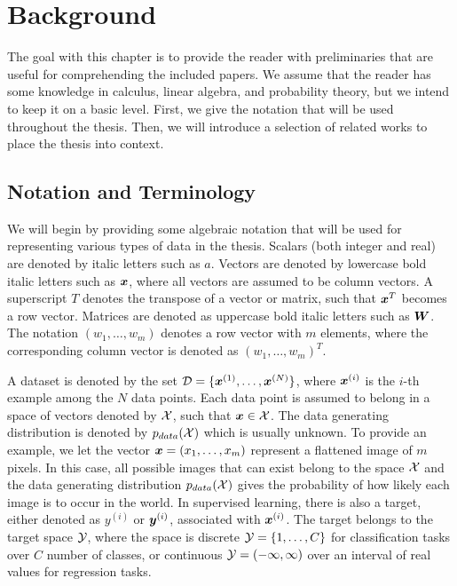 
\chapter{Background}
\label{chap:background}

The goal with this chapter is to provide the reader with preliminaries that are useful for comprehending the included papers. We assume that the reader has some knowledge in calculus, linear algebra, and probability theory, but we intend to keep it on a basic level. First, we give the notation that will be used throughout the thesis. Then, we will introduce a selection of related works to place the thesis into context. 

\section{Notation and Terminology}\label{sec:notation}

We will begin by providing some algebraic notation that will be used for representing various types of data in the thesis. Scalars (both integer and real) are denoted by italic letters such as $a$. Vectors are denoted by lowercase bold italic letters such as ${\bm{x}}$, where all vectors are assumed to be column vectors. A superscript $T$ denotes the transpose of a vector or matrix, such that ${\bm{x}}^{T}$ becomes a row vector. Matrices are denoted as uppercase bold italic letters such as ${\bm{W}}$. The notation $(w_1, \dots, w_m)$ denotes a row vector with $m$ elements, where the corresponding column vector is denoted as $(w_1, \dots, w_m)^{T}$. 

A dataset is denoted by the set ${\mathcal{D}} = \{{\bm{x}}^{(1)}, \dots, {\bm{x}}^{(N)} \}$, where ${\bm{x}}^{(i)}$ is the $i$-th example among the $N$ data points. Each data point is assumed to belong in a space of vectors denoted by ${\mathcal{X}}$, such that ${\bm{x}} \in {\mathcal{X}}$. The data generating distribution is denoted by $p_{data}({\mathcal{X}})$ which is usually unknown. To provide an example, we let the vector ${\bm{x}} = (x_1, \dots, x_m)$ represent a flattened image of $m$ pixels. In this case, all possible images that can exist belong to the space ${\mathcal{X}}$ and the data generating distribution $p_{data}({\mathcal{X}})$ gives the probability of how likely each image is to occur in the world. In supervised learning, there is also a target, either denoted as $y^{(i)}$ or ${\bm{y}}^{(i)}$, associated with ${\bm{x}}^{(i)}$. The target belongs to the target space ${\mathcal{Y}}$, where the space is discrete ${\mathcal{Y}} = \{1, \dots, C\}$ for classification tasks over $C$ number of classes, or continuous ${\mathcal{Y}} = (-\infty, \infty)$ over an interval of real values for regression tasks. 

